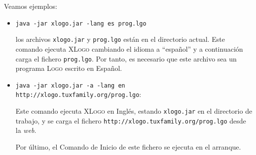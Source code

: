 Veamos ejemplos:
\begin{itemize}
   \item \texttt{java -jar xlogo.jar -lang es prog.lgo} 

      los archivos \texttt{xlogo.jar} y \texttt{prog.lgo} est\'an en el directorio
      actual. Este comando ejecuta \textsc{XLogo} cambiando el idioma a ``espa\~nol''
      y a continuaci\'on carga el fichero \texttt{prog.lgo}. Por tanto, es necesario
      que este archivo sea un programa \textsc{Logo} escrito en Espa\~nol.
   \item \texttt{java -jar xlogo.jar -a -lang en http://xlogo.tuxfamily.org/prog.lgo}:

      Este comando ejecuta \textsc{XLogo} en Ingl\'es, estando \texttt{xlogo.jar} en
      el directorio de trabajo, y se carga el fichero 
      \mbox{\texttt{http://xlogo.tuxfamily.org/prog.lgo}} desde la \textit{web}.

      Por \'ultimo, el Comando de Inicio de este fichero se ejecuta en el arranque.
\end{itemize}